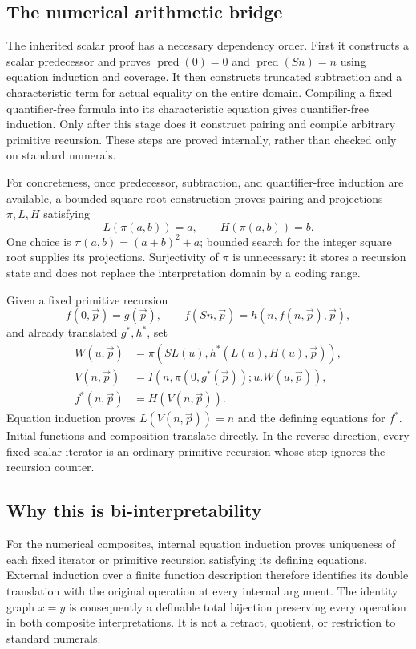 \subsection{The numerical arithmetic bridge}
The inherited scalar proof has a necessary dependency order. First it
constructs a scalar predecessor and proves $\operatorname{pred}(0)=0$
and $\operatorname{pred}(Sn)=n$ using equation induction and coverage.
It then constructs truncated subtraction and a characteristic term
for actual equality on the entire domain. Compiling a fixed
quantifier-free formula into its characteristic equation gives
quantifier-free induction. Only after this stage does it construct
pairing and compile arbitrary primitive recursion. These steps are
proved internally, rather than checked only on standard numerals.

For concreteness, once predecessor, subtraction, and quantifier-free
induction are available, a bounded square-root construction proves
pairing and projections $\pi,L,H$ satisfying
\[
 L(\pi(a,b))=a,\qquad H(\pi(a,b))=b.
\]
One choice is $\pi(a,b)=(a+b)^2+a$; bounded search for the integer
square root supplies its projections. Surjectivity of $\pi$ is
unnecessary: it stores a recursion state and does not replace the
interpretation domain by a coding range.

Given a fixed primitive recursion
\[
 f(0,\vec p)=g(\vec p),\qquad
 f(Sn,\vec p)=h(n,f(n,\vec p),\vec p),
\]
and already translated $g^*,h^*$, set
\[
 \begin{aligned}
 W(u,\vec p)&=\pi(SL(u),h^*(L(u),H(u),\vec p)),\\
 V(n,\vec p)&=I(n,\pi(0,g^*(\vec p));u.W(u,\vec p)),\\
 f^*(n,\vec p)&=H(V(n,\vec p)).
 \end{aligned}
\]
Equation induction proves $L(V(n,\vec p))=n$ and the defining equations
for $f^*$. Initial functions and composition translate directly.
In the reverse direction, every fixed scalar iterator is an ordinary
primitive recursion whose step ignores the recursion counter.

\subsection{Why this is bi-interpretability}
For the numerical composites, internal equation induction proves
uniqueness of each fixed iterator or primitive recursion satisfying
its defining equations. External induction over a finite function
description therefore identifies its double translation with the
original operation at every internal argument. The identity graph
$x=y$ is consequently a definable total bijection preserving every
operation in both composite interpretations. It is not a retract,
quotient, or restriction to standard numerals.

